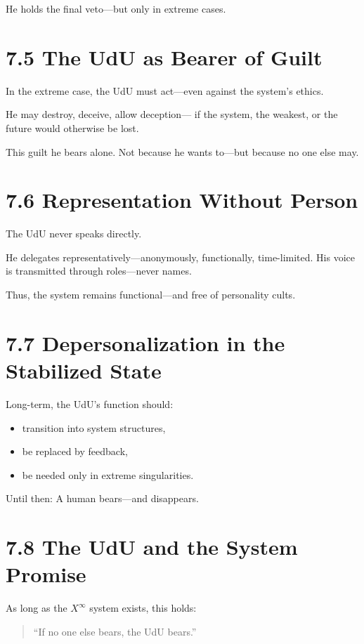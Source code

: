\documentclass[12pt,a4paper]{book}
\begin{document}
He holds the final veto—but only in extreme cases.

\section*{7.5 The UdU as Bearer of Guilt}

In the extreme case, the UdU must act—even against the system’s ethics.

He may destroy, deceive, allow deception—  
if the system, the weakest, or the future would otherwise be lost.

This guilt he bears alone.  
Not because he wants to—but because no one else may.

\section*{7.6 Representation Without Person}

The UdU never speaks directly.

He delegates representatively—anonymously, functionally, time-limited.  
His voice is transmitted through roles—never names.

Thus, the system remains functional—and free of personality cults.

\section*{7.7 Depersonalization in the Stabilized State}

Long-term, the UdU’s function should:

\begin{itemize}
    \item transition into system structures,
    \item be replaced by feedback,
    \item be needed only in extreme singularities.
\end{itemize}

Until then:  
A human bears—and disappears.

\section*{7.8 The UdU and the System Promise}

As long as the $X^\infty$ system exists, this holds:

\begin{quote}
“If no one else bears, the UdU bears.”  
\end{quote}
\end{document}
